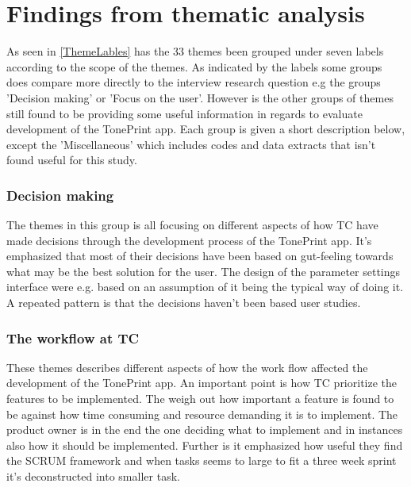 \section{Findings from thematic analysis}
\label{ThematicFindings}
%
As seen in \autoref{ThemeLables} has the 33 themes been grouped under seven labels according to the scope of the themes. As indicated by the labels some groups does compare more directly to the interview research question e.g the groups 'Decision making' or 'Focus on the user'. However is the other groups of themes still found to be providing some useful information in regards to evaluate development of the TonePrint app. Each group is given a short description below, except the 'Miscellaneous' which includes codes and data extracts that isn't found useful for this study.\\
\subsubsection*{Decision making}
The themes in this group is all focusing on different aspects of how TC have made decisions through the development process of the TonePrint app. It's emphasized that most of their decisions have been based on gut-feeling towards what may be the best solution for the user. The design of the parameter settings interface were e.g. based on an assumption of it being the typical way of doing it. A repeated pattern is that the decisions haven't been based user studies. 

\subsubsection*{The workflow at TC}
These themes describes different aspects of how the work flow affected the development of the TonePrint app. An important point is how TC prioritize the features to be implemented. The weigh out how important a feature is found to be against how time consuming and resource demanding it is to implement. The product owner is in the end the one deciding what to implement and in instances also how it should be implemented. Further is it emphasized how useful they find the SCRUM framework and when tasks seems to large to fit a three week sprint it's deconstructed into smaller task.  

